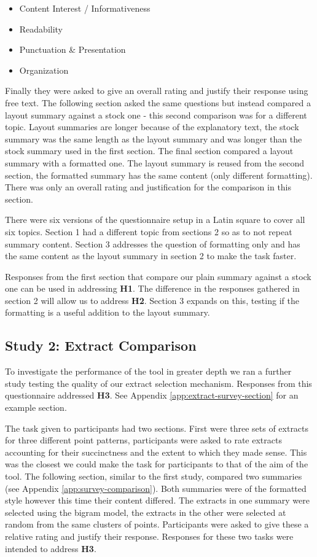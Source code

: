       \begin{itemize}
        \item{Content Interest / Informativeness}
        \item{Readability}
        \item{Punctuation \& Presentation}
        \item{Organization}
      \end{itemize}

      Finally they were asked to give an overall rating and justify their response using free text. The following section asked the same questions but instead compared a layout summary against a stock one - this second comparison was for a different topic. Layout summaries are longer because of the explanatory text, the stock summary was the same length as the layout summary and was longer than the stock summary used in the first section. The final section compared a layout summary with a formatted one. The layout summary is reused from the second section, the formatted summary has the same content (only different formatting). There was only an overall rating and justification for the comparison in this section.

      There were six versions of the questionnaire setup in a Latin square to cover all six topics. Section 1 had a different topic from sections 2 so as to not repeat summary content. Section 3 addresses the question of formatting only and has the same content as the layout summary in section 2 to make the task faster.

      Responses from the first section that compare our plain summary against a stock one can be used in addressing \textbf{H1}. The difference in the responses gathered in section 2 will allow us to address \textbf{H2}. Section 3 expands on this, testing if the formatting is a useful addition to the layout summary.

    \tocless\subsection{Study 2: Extract Comparison}
    To investigate the performance of the tool in greater depth we ran a further study testing the quality of our extract selection mechanism. Responses from this questionnaire addressed \textbf{H3}. See Appendix \ref{app:extract-survey-section} for an example section.

    The task given to participants had two sections. First were three sets of extracts for three different point patterns, participants were asked to rate extracts accounting for their succinctness and the extent to which they made sense. This was the closest we could make the task for participants to that of the aim of the tool. The following section, similar to the first study, compared two summaries (see Appendix \ref{app:survey-comparison}). Both summaries were of the formatted style however this time their content differed. The extracts in one summary were selected using the bigram model, the extracts in the other were selected at random from the same clusters of points. Participants were asked to give these a relative rating and justify their response. Responses for these two tasks were intended to address \textbf{H3}.

